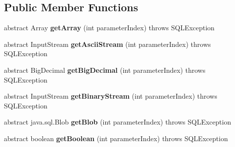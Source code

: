 \subsection*{Public Member Functions}
\begin{DoxyCompactItemize}
\item 
\mbox{\label{interfacecom_1_1mysql_1_1jdbc_1_1_parameter_bindings_ad7af75d968a3a553ac9e04a878462ed8}} 
abstract Array {\bfseries get\+Array} (int parameter\+Index)  throws S\+Q\+L\+Exception
\item 
\mbox{\label{interfacecom_1_1mysql_1_1jdbc_1_1_parameter_bindings_abc5ffdd1944acc033b4a745b08a74a85}} 
abstract Input\+Stream {\bfseries get\+Ascii\+Stream} (int parameter\+Index)  throws S\+Q\+L\+Exception
\item 
\mbox{\label{interfacecom_1_1mysql_1_1jdbc_1_1_parameter_bindings_a9ac8af6e01146ca5a6f815652042ad48}} 
abstract Big\+Decimal {\bfseries get\+Big\+Decimal} (int parameter\+Index)  throws S\+Q\+L\+Exception
\item 
\mbox{\label{interfacecom_1_1mysql_1_1jdbc_1_1_parameter_bindings_a104d820da8ab24af2873b087094eaa0c}} 
abstract Input\+Stream {\bfseries get\+Binary\+Stream} (int parameter\+Index)  throws S\+Q\+L\+Exception
\item 
\mbox{\label{interfacecom_1_1mysql_1_1jdbc_1_1_parameter_bindings_a31ebcdeb69de6603cc2fd51a8356996a}} 
abstract java.\+sql.\+Blob {\bfseries get\+Blob} (int parameter\+Index)  throws S\+Q\+L\+Exception
\item 
\mbox{\label{interfacecom_1_1mysql_1_1jdbc_1_1_parameter_bindings_a7fecdcd65f80b38d9873b401000d7d03}} 
abstract boolean {\bfseries get\+Boolean} (int parameter\+Index)  throws S\+Q\+L\+Exception
\item 
\mbox{\label{interfacecom_1_1mysql_1_1jdbc_1_1_parameter_bindings_a71fbcebe784206a45c0273b8f92c4037}} 

\end{DoxyCompactItemize}
